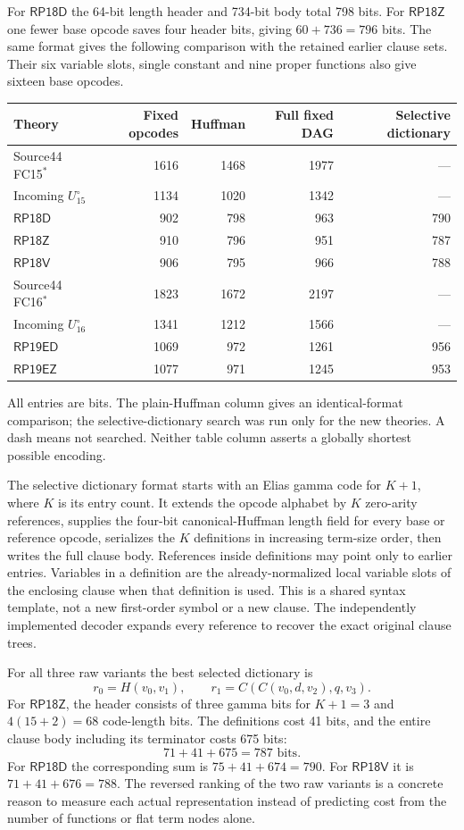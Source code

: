 \documentclass[11pt]{article}
\newcommand{\RP}{\mathsf{RP18D}}
\newcommand{\RPZ}{\mathsf{RP18Z}}
\newcommand{\RPV}{\mathsf{RP18V}}
\newcommand{\RPE}{\mathsf{RP19ED}}
\newcommand{\RPEZ}{\mathsf{RP19EZ}}
\begin{document}
For $\RP$ the 64-bit length header and 734-bit body total 798 bits.
For $\RPZ$ one fewer base opcode saves four header bits, giving
$60+736=796$ bits. The same format gives the following comparison with
the retained earlier clause sets. Their six variable slots, single
constant and nine proper functions also give sixteen base opcodes.

\begin{center}\small
\begin{tabular}{lrrrr}
\toprule
Theory & Fixed opcodes & Huffman & Full fixed DAG & Selective dictionary\\
\midrule
Source44 FC15$^*$ &1616&1468&1977&---\\
Incoming $U_{15}^{\circ}$ &1134&1020&1342&---\\
$\RP$ &902&798&963&790\\
$\RPZ$ &910&796&951&787\\
$\RPV$ &906&795&966&788\\
\midrule
Source44 FC16$^*$ &1823&1672&2197&---\\
Incoming $U_{16}^{\circ}$ &1341&1212&1566&---\\
$\RPE$ &1069&972&1261&956\\
$\RPEZ$ &1077&971&1245&953\\
\bottomrule
\end{tabular}
\end{center}
All entries are bits. The plain-Huffman column gives an identical-format
comparison; the selective-dictionary search was run only for the new
theories. A dash means not searched. Neither table column asserts a
globally shortest possible encoding.

The selective dictionary format starts with an Elias gamma code for
$K+1$, where $K$ is its entry count. It extends the opcode alphabet by
$K$ zero-arity references, supplies the four-bit canonical-Huffman length
field for every base or reference opcode, serializes the $K$ definitions
in increasing term-size order, then writes the full clause body.
References inside definitions may point only to earlier entries.
Variables in a definition are the already-normalized local variable
slots of the enclosing clause when that definition is used. This is a
shared syntax template, not a new first-order symbol or a new clause.
The independently implemented decoder expands every reference to recover
the exact original clause trees.

For all three raw variants the best selected dictionary is
\[
 r_0=H(v_0,v_1),\qquad
 r_1=C(C(v_0,d,v_2),q,v_3).
\]
For $\RPZ$, the header consists of three gamma bits for $K+1=3$
and $4(15+2)=68$ code-length bits. The definitions cost 41 bits,
and the entire clause body including its terminator costs 675 bits:
\[
 \boxed{71+41+675=787\text{ bits}.}
\]
For $\RP$ the corresponding sum is $75+41+674=790$.
For $\RPV$ it is $71+41+676=788$.
The reversed ranking of the two raw variants is a concrete reason to
measure each actual representation instead of predicting cost from the
number of functions or flat term nodes alone.
\end{document}
